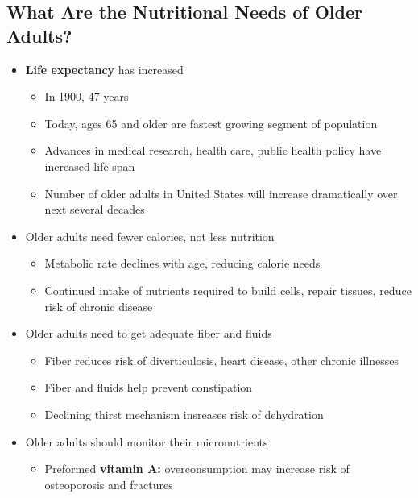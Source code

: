 \documentclass[12pt]{article}
\begin{document}
        \subsection{What Are the Nutritional Needs of Older Adults?}
            \begin{itemize}
                \item \textbf{Life expectancy} has increased
                    \begin{itemize}
                        \item In 1900, 47 years
                        \item Today, ages 65 and older are fastest growing segment of population
                        \item Advances in medical research, health care, public health policy have increased life span
                        \item Number of older adults in United States will increase dramatically over next several decades
                    \end{itemize}
                \item Older adults need fewer calories, not less nutrition
                    \begin{itemize}
                        \item Metabolic rate declines with age, reducing calorie needs
                        \item Continued intake of nutrients required to build cells, repair tissues, reduce risk of chronic disease
                    \end{itemize}
                \item Older adults need to get adequate fiber and fluids
                    \begin{itemize}
                        \item Fiber reduces risk of diverticulosis, heart disease, other chronic illnesses
                        \item Fiber and fluids help prevent constipation
                        \item Declining thirst mechanism insreases risk of dehydration
                    \end{itemize}
                \item Older adults should monitor their micronutrients
                    \begin{itemize}
                        \item Preformed \textbf{vitamin A:} overconsumption may increase risk of osteoporosis and fractures

\end{itemize}
\end{itemize}
\end{document}

